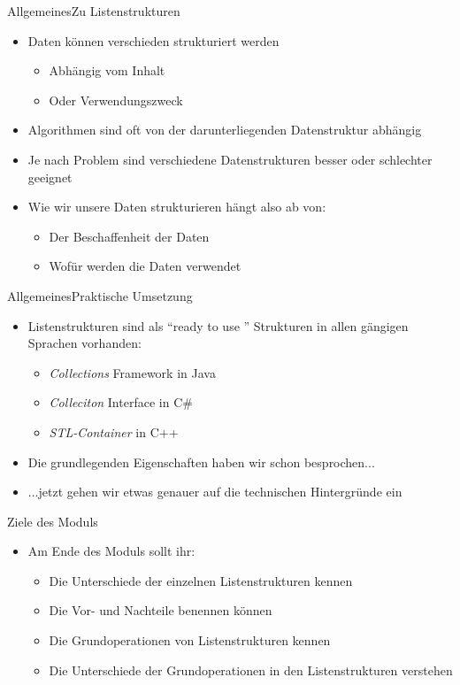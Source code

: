 \begin{frame}{Allgemeines}{Zu Listenstrukturen}
	\begin{itemize}
		\item Daten können verschieden strukturiert werden
		\begin{itemize}
			\item Abhängig vom Inhalt
			\item Oder Verwendungszweck
		\end{itemize}
		\item Algorithmen sind oft von der darunterliegenden Datenstruktur abhängig
		\item Je nach Problem sind verschiedene Datenstrukturen besser oder schlechter geeignet
		\item Wie wir unsere Daten strukturieren hängt also ab von:
		\begin{itemize}
			\item Der Beschaffenheit der Daten
			\item Wofür werden die Daten verwendet
		\end{itemize}
	\end{itemize}
\end{frame}

\begin{frame}{Allgemeines}{Praktische Umsetzung}
	\begin{itemize}
		\item Listenstrukturen sind als "`ready to use "' Strukturen in allen gängigen Sprachen vorhanden:
		\begin{itemize}
			\item \textit{Collections} Framework in Java
			\item \textit{Colleciton} Interface in C\#
			\item \textit{STL-Container} in C++
		\end{itemize}
		\item Die grundlegenden Eigenschaften haben wir schon besprochen...
		\item ...jetzt gehen wir etwas genauer auf die technischen Hintergründe ein
	\end{itemize}
\end{frame}

\begin{frame}{Ziele des Moduls}
	\begin{itemize}
		\item Am Ende des Moduls sollt ihr:
		\begin{itemize}
			\item Die Unterschiede der einzelnen Listenstrukturen kennen
			\item Die Vor- und Nachteile benennen können
			\item Die Grundoperationen von Listenstrukturen kennen
			\item Die Unterschiede der Grundoperationen in den Listenstrukturen verstehen
		\end{itemize}
	\end{itemize}
\end{frame}

